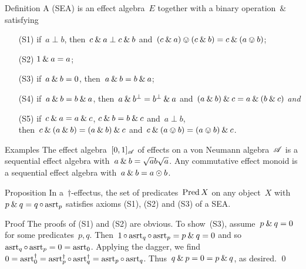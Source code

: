 \documentclass[b]{subfiles}
\begin{document}
\begin{parsec}
\begin{point}
\begin{point}
    \cite{li2011sequential,gudder2005open,shen2009not,gudder2005uniqueness,jun2009remarks,weihua2009uniqueness,tkadlec2008atomic,jia2010entropy,arias2004almost}
\end{point}
\end{point}
\begin{point}{Definition}%
A  (SEA)
    is an effect algebra~$E$ together
    with a binary operation~$\&$
    satisfying
\begin{enumerate}
    \item[(S1)] if~$a \perp b$,
        then~$c \mathbin{\&} a \perp c \mathbin{\&} b$
        and~$(c \mathbin{\&} a) \ovee (c \mathbin{\&} b)
                = c \mathbin{\&} (a \ovee b)$;
    \item[(S2)] $1 \mathbin{\&} a =a$;
    \item[(S3)] if~$a \mathbin{\&} b = 0$,
            then~$a \mathbin{\&} b = b \mathbin{\&} a$;
    \item[(S4)]
        if~$a \mathbin{\&} b = b \mathbin{\&} a$,
        then~$a \mathbin{\&} b^\perp = b^\perp \mathbin{\&} a$
        and~$(a \mathbin{\&} b) \mathbin{\&} c
            = a \mathbin{\&} (b \mathbin{\&} c) $ \emph{and}
    \item[(S5)]
        if~$c \mathbin{\&} a = a \mathbin{\&} c$,
        $c \mathbin{\&} b = b \mathbin{\&} c$ and~$a \perp b$,\\
        then~$c \mathbin{\&} (a \mathbin{\&} b)
                = (a \mathbin{\&} b) \mathbin{\&} c$
                and~$c \mathbin{\&} (a \ovee b) = (a \ovee b) \mathbin{\&} c$.
\end{enumerate}
\end{point}
\begin{point}{Examples}%
The effect algebra~$[0,1]_{\mathscr{A}}$
    of effects on a von Neumann algebra~$\mathscr{A}$
    is a sequential effect algebra with~$a \mathbin{\&} b = \sqrt{a}b\sqrt{a}$.
Any commutative effect monoid is a sequential effect algebra
    with~$a \mathbin{\&} b = a \odot b$.
\begin{point}%
\end{point}
\end{point}
\begin{point}{Proposition}%
In a~$\dagger$-effectus,
    the set of predicates~$\operatorname{Pred} X$ on any object~$X$
    with~$p \mathbin{\&} q = q \mathop{\circ} \mathrm{asrt}_p$
    satisfies axioms (S1), (S2) and (S3) of a SEA.
\begin{point}{Proof}%
The proofs of (S1) and (S2) are obvious.
To show~(S3), assume~$p \mathbin{\&} q = 0$
    for some predicates~$p,q$.
    Then~$1 \mathop{\circ} \mathrm{asrt}_q \mathop{\circ} \mathrm{asrt}_p  = p \mathbin{\&} q= 0$
and so~$\mathrm{asrt}_q \mathop{\circ} \mathrm{asrt}_p = 0 = \mathrm{asrt}_0$.
Applying the dagger, we find
$0 = \mathrm{asrt}_0^\dagger = \mathrm{asrt}_p^\dagger \mathop{\circ} \mathrm{asrt}_q^\dagger
                = \mathrm{asrt}_p \mathop{\circ} \mathrm{asrt}_q$.
    Thus~$q \mathbin{\&} p = 0 = p \mathbin{\&} q$, as desired. \qed
\end{point}
\end{point}
\end{parsec}
\end{document}
